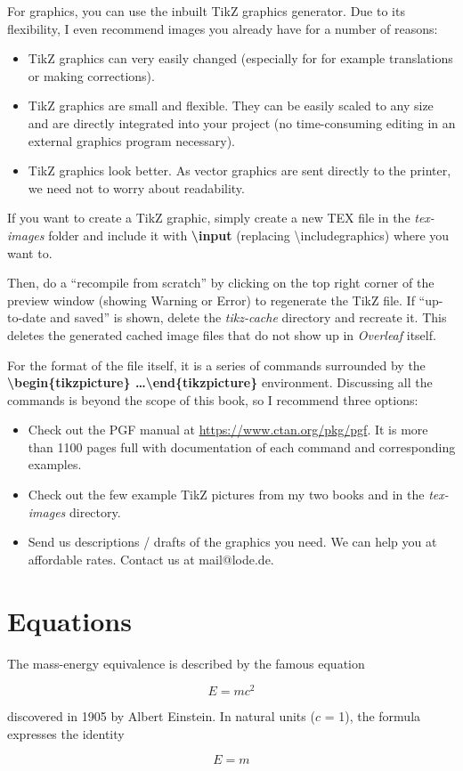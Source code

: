 For graphics, you can use the inbuilt TikZ graphics generator. Due to its flexibility, I even recommend images you already have for a number of reasons:

\begin{itemize}
\item TikZ graphics can very easily changed (especially for for example translations or making corrections).
\item TikZ graphics are small and flexible. They can be easily scaled to any size and are directly integrated into your project (no time-consuming editing in an external graphics program necessary).
\item TikZ graphics look better. As vector graphics are sent directly to the printer, we need not to worry about readability.
\end{itemize}

If you want to create a TikZ graphic, simply create a new TEX file in the \textit{tex-images} folder and include it with \textbf{\textbackslash input} (replacing \textbackslash includegraphics) where you want to. 

Then, do a ``recompile from scratch'' by clicking on the top right corner of the preview window (showing Warning or Error) to regenerate the TikZ file. If ``up-to-date and saved'' is shown, delete the \textit{tikz-cache} directory and recreate it. This deletes the generated cached image files that do not show up in \textit{Overleaf} itself.

For the format of the file itself, it is a series of commands surrounded by the \textbf{\textbackslash begin\{tikzpicture\} \dots \textbackslash end\{tikzpicture\}} environment. Discussing all the commands is beyond the scope of this book, so I recommend three options:

\begin{itemize}
\item Check out the PGF manual at \url{https://www.ctan.org/pkg/pgf}. It is more than 1100 pages full with documentation of each command and corresponding examples.
\item Check out the few example TikZ pictures from my two books  and  in the \textit{tex-images} directory.
\item Send us descriptions / drafts of the graphics you need. We can help you at affordable rates. Contact us at mail@lode.de.
\end{itemize}

\section{Equations}\label{c2_equations:sec}

The mass-energy equivalence is described by the famous equation
 
$$E=mc^2$$
 
discovered in 1905 by Albert Einstein. 
In natural units ($c$ = 1), the formula expresses the identity
 
\begin{equation}
E=m
\end{equation}